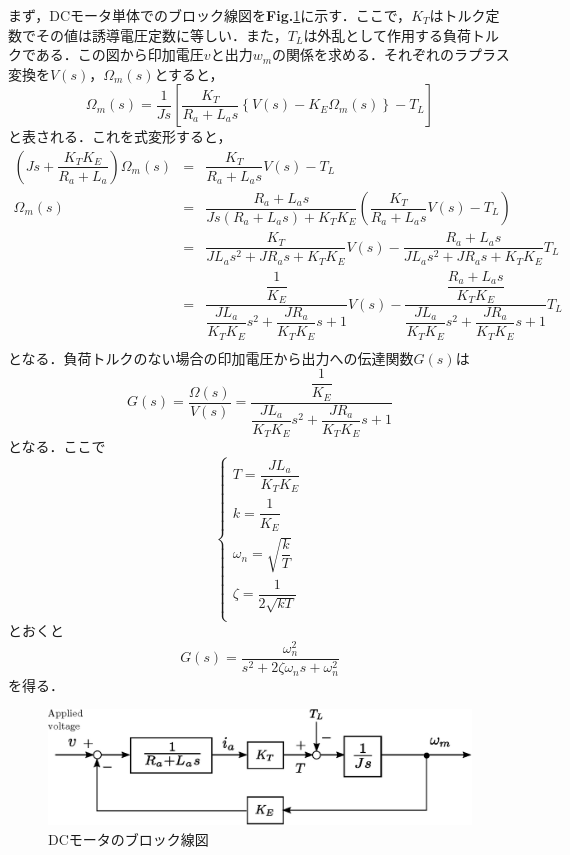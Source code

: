 \documentclass[a4paper,12pt]{jarticle}
\begin{document}
まず，DCモータ単体でのブロック線図を{\bf Fig.}\ref{DCmodel}に示す．ここで，$ K_T $はトルク定数でその値は誘導電圧定数に等しい．また，$ T_L $は外乱として作用する負荷トルクである．この図から印加電圧$ v $と出力$ w_m $の関係を求める．それぞれのラプラス変換を$ V(s) $，$ \Omega_m (s) $とすると，
%
\begin{equation}
 \Omega_m (s) = \dfrac{1}{J s} \left[ \dfrac{K_T}{R_a + L_a s} \left\{ V(s) - K_E \Omega_m (s) \right\} - T_L \right]
\end{equation}
%
と表される．これを式変形すると，
%
\begin{equation*}
 \begin{array}{rcl}
  \left( J s + \dfrac{K_T K_E}{R_a + L_a} \right) \Omega_m(s) & = & \dfrac{K_T}{R_a + L_a s} V(s) - T_L \\
  \Omega_m (s) & = & \dfrac{R_a + L_a s}{J s (R_a +L_a s) + K_T K_E} \left( \dfrac{K_T}{R_a + L_a s} V(s) - T_L \right)  \\
               & = & \dfrac{K_T}{J L_a s^2 + J R_a s + K_T K_E} V(s) - \dfrac{R_a + L_a s}{J L_a s^2 + J R_a s +K_T K_E} T_L \\
               & = & \dfrac{ \dfrac{1}{K_E} }{ \dfrac{JL_a}{K_T K_E} s^2 + \dfrac{J R_a}{K_T K_E} s + 1 }V(s) - \dfrac{ \dfrac{R_a + L_a s}{K_T K_E} }{ \dfrac{JL_a}{K_T K_E} s^2 + \dfrac{J R_a}{K_T K_E} s + 1 }T_L \\
 \end{array}
\end{equation*}
%
となる．負荷トルクのない場合の印加電圧から出力への伝達関数$ G(s) $は
%
\begin{equation}
 G(s) = \dfrac{\Omega(s)}{V(s)} = \dfrac{ \dfrac{1}{K_E} }{ \dfrac{J L_a}{K_T K_E}s^2 + \dfrac{J R_a}{K_T K_E}s + 1 }
\end{equation}
%
となる．ここで
%
\begin{equation}
 \left\{
  \begin{array}{l}
   T = \dfrac{JL_a}{K_T K_E} \\
   k = \dfrac{1}{K_E} \\
   \omega_n = \sqrt{\dfrac{k}{T}} \\
   \zeta = \dfrac{1}{ 2 \sqrt{kT}} \\
  \end{array}
 \right.
\end{equation}
%
とおくと
%
\begin{equation}
 G(s) = \dfrac{\omega_n^2}{s^2 + 2 \zeta \omega_n s + \omega_n^2}
\end{equation}
%
を得る．
%
\begin{figure}[tb]
 \begin{center}
  \includegraphics[scale=0.8]{../figure/eps/DCmodel.eps}
  \caption{DCモータのブロック線図}
  \label{DCmodel}
 \end{center}
\end{figure}
\end{document}
